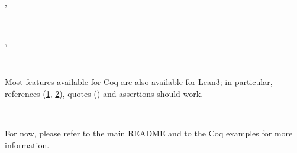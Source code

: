 \documentclass[a4paper]{article}
\begin{document}
\begin{alectryon}
\begin{sentence}
\begin{output}
\begin{goals}
\begin{goal}
        \end{goal}
      \end{goals}
    \end{output}
  \end{sentence}
  \sep
  \begin{sentence}
    \begin{input}
      ~~~~~~\nl
    \end{input}
  \end{sentence}
  \sep
  \begin{sentence}
    \begin{input}
      ~~\nl
    \end{input}
  \end{sentence}
\end{alectryon}

Most features available for Coq are also available for Lean3; in particular, references (\hyperref[literate-lean3-lean-s-intro-h-0]{1}, \hyperref[literate-lean3-lean-s-and-intro-h-h-0]{2}), quotes () and assertions should work.

\begin{alectryon}
  ~~~~~~
\end{alectryon}

For now, please refer to the main README and to the Coq examples for more information.
\end{document}
